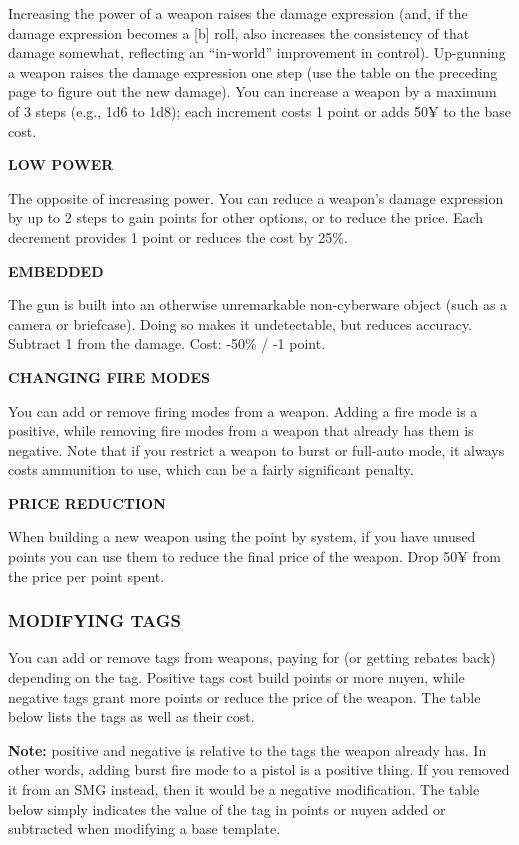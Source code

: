 \documentclass[oneside,10pt]{article}
\begin{document}
\begin{multicols}{2}
Increasing the power of a weapon raises the damage expression (and, if the damage expression becomes a [b] roll,
also increases the consistency of that damage somewhat, reflecting an “in-world” improvement in control). Up-gunning
a weapon raises the damage expression one step (use the
table on the preceding page to figure out the new damage).
You can increase a weapon by a maximum of 3 steps (e.g.,
1d6 to 1d8); each increment costs 1 point or adds 50¥ to the
base cost.

\textbf{LOW POWER}

The opposite of increasing power. You can reduce a weapon’s
damage expression by up to 2 steps to gain points for other
options, or to reduce the price. Each decrement provides 1
point or reduces the cost by 25\%.

\textbf{EMBEDDED}

The gun is built into an otherwise unremarkable non-cyberware object (such as a camera or briefcase). Doing so makes
it undetectable, but reduces accuracy. Subtract 1 from the
damage. Cost: -50\% / -1 point.

\textbf{CHANGING FIRE MODES}

You can add or remove firing modes from a weapon. Adding
a fire mode is a positive, while removing fire modes from a
weapon that already has them is negative. Note that if you
restrict a weapon to burst or full-auto mode, it always costs
ammunition to use, which can be a fairly significant penalty.

\textbf{PRICE REDUCTION}

When building a new weapon using the point by system, if
you have unused points you can use them to reduce the final
price of the weapon. Drop 50¥ from the price per point spent.

\subsubsection{MODIFYING TAGS}
You can add or remove tags from weapons, paying for (or
getting rebates back) depending on the tag. Positive tags cost
build points or more nuyen, while negative tags grant more
points or reduce the price of the weapon. The table below
lists the tags as well as their cost.

\textbf{Note:} positive and negative is relative to the tags the weapon already has. In other words, adding burst fire mode to
a pistol is a positive thing. If you removed it from an SMG
instead, then it would be a negative modification. The table
below simply indicates the value of the tag in points or nuyen added or subtracted when modifying a base template.


\end{multicols}
\end{document}
